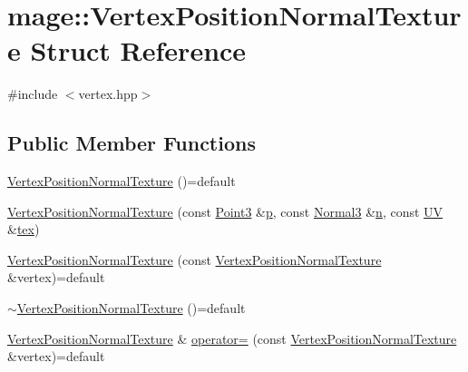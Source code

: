 \hypertarget{structmage_1_1_vertex_position_normal_texture}{}\section{mage\+:\+:Vertex\+Position\+Normal\+Texture Struct Reference}
\label{structmage_1_1_vertex_position_normal_texture}


{\ttfamily \#include $<$vertex.\+hpp$>$}

\subsection*{Public Member Functions}
\begin{DoxyCompactItemize}
\item 
\hyperlink{structmage_1_1_vertex_position_normal_texture_a05158b4e9daf54137a2b8fba80890034}{Vertex\+Position\+Normal\+Texture} ()=default
\item 
\hyperlink{structmage_1_1_vertex_position_normal_texture_af05d124e38e88cf4ecbcf4eccf6bc100}{Vertex\+Position\+Normal\+Texture} (const \hyperlink{structmage_1_1_point3}{Point3} \&\hyperlink{structmage_1_1_vertex_position_normal_texture_a9000b80274027dd7b7d258f45523ca65}{p}, const \hyperlink{structmage_1_1_normal3}{Normal3} \&\hyperlink{structmage_1_1_vertex_position_normal_texture_a442eb1609ab596e3e33c26f7be32695a}{n}, const \hyperlink{structmage_1_1_u_v}{UV} \&\hyperlink{structmage_1_1_vertex_position_normal_texture_a0782e41c5e28d421bfb47afad9af9c55}{tex})
\item 
\hyperlink{structmage_1_1_vertex_position_normal_texture_ac3c1a1038a7a493de5a314c383a84ce4}{Vertex\+Position\+Normal\+Texture} (const \hyperlink{structmage_1_1_vertex_position_normal_texture}{Vertex\+Position\+Normal\+Texture} \&vertex)=default
\item 
\hyperlink{structmage_1_1_vertex_position_normal_texture_a1dbfd9a6f88f075b59e56c353986b189}{$\sim$\+Vertex\+Position\+Normal\+Texture} ()=default
\item 
\hyperlink{structmage_1_1_vertex_position_normal_texture}{Vertex\+Position\+Normal\+Texture} \& \hyperlink{structmage_1_1_vertex_position_normal_texture_a89b92b0932f3271cb90c3a800e6c60a3}{operator=} (const \hyperlink{structmage_1_1_vertex_position_normal_texture}{Vertex\+Position\+Normal\+Texture} \&vertex)=default
\end{DoxyCompactItemize}
